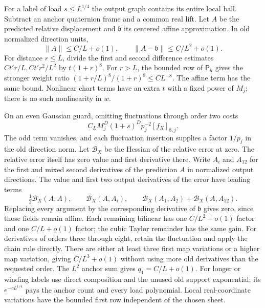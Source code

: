 For a label of load $s\le L^{1/4}$ the output graph contains its entire
local ball.  Subtract an anchor quaternion frame and a common real
lift.  Let $A$ be the predicted relative displacement and
$\mathfrak b$ its centered affine approximation.  In old normalized
direction units,
\[
                    \|A\|\le C/L+o(1),\qquad
          \|A-\mathfrak b\|\le C/L^2+o(1).
\]
For distance $r\le L$, divide the first and second difference estimates
$Ct'r/L,Ct'r^2/L^2$ by $t(1+r)^8$.  For $r>L$, the bounded row of
$\mathsf P_h$ gives the stronger weight ratio
$(1+r/L)^8/(1+r)^8\le CL^{-8}$.  The affine term has the same bound.
Nonlinear chart terms have an extra $t$ with a fixed power of $M_j$;
there is no such nonlinearity in $w$.

On an even Gaussian guard, omitting fluctuations through order two
costs
\[
 C_LM_j^D(1+s)^Dp_j^{-2}[f_X]_{8,j}.
\]
The odd term vanishes, and each fluctuation insertion supplies a factor
$1/p_j$ in the old direction norm.  Let $\mathcal B_X$ be the Hessian of the relative
error at zero.  The relative error itself has zero value and first
derivative there.  Write $A_i$ and $A_{12}$ for the first and mixed
second derivatives of the prediction $A$ in normalized output directions.
The value and first two output derivatives of the error have leading terms
\[
 \tfrac12\mathcal B_X(A,A),\qquad
 \mathcal B_X(A,A_i),\qquad
 \mathcal B_X(A_1,A_2)+\mathcal B_X(A,A_{12}).
\]
Replacing every argument by the corresponding derivative of
$\mathfrak b$ gives zero, since those fields remain affine.  Each
remaining bilinear has one $C/L^2+o(1)$ factor and one $C/L+o(1)$
factor; the cubic Taylor remainder has the same gain.  For derivatives
of orders three through eight, retain the fluctuation and apply the
chain rule directly.  There are either at least three first map
variations or a higher map variation, giving $C/L^3+o(1)$ without using
more old derivatives than the requested order.  The $L^2$ anchor sum
gives $q_1=C/L+o(1)$.  For longer or winding labels use direct composition
and the unused old support exponential; its $e^{-cL^{1/4}}$ pays the
anchor count and every load polynomial.  Local real-coordinate
variations have the bounded first row independent of the chosen sheet.

